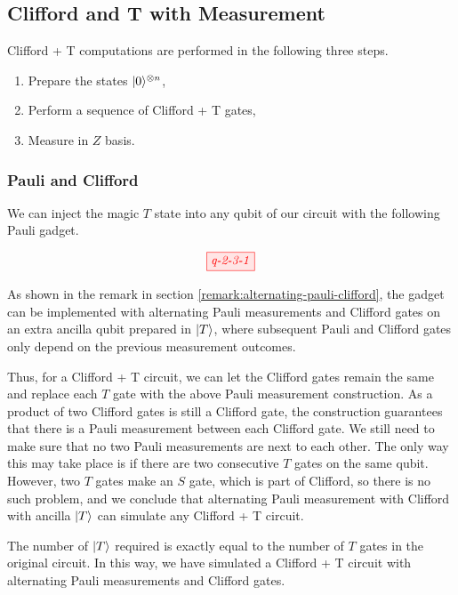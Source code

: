 \subsection{Clifford and T with Measurement}

Clifford + T computations are performed in the following three steps.
\begin{enumerate}
	\item Prepare the states $|0\rangle^{\otimes n}$,
	\item Perform a sequence of Clifford + T gates,
	\item Measure in $Z$ basis.
\end{enumerate}


\subsubsection{Pauli and Clifford}




We can inject the magic $T$ state into any qubit of our circuit with the following Pauli gadget.

\begin{align}\label{eq:embed-S}
	\tikzfig{q-2-3-1}
\end{align}

As shown in the remark in section \ref{remark:alternating-pauli-clifford}, the gadget can be implemented with alternating Pauli measurements and Clifford gates on an extra ancilla qubit prepared in $|T\rangle$, where subsequent Pauli and Clifford gates only depend on the previous measurement outcomes.

Thus, for a Clifford + T circuit, we can let the Clifford gates remain the same and replace each $T$ gate with the above Pauli measurement construction. 
As a product of two Clifford gates is still a Clifford gate, the construction guarantees that there is a Pauli measurement between each Clifford gate. 
We still need to make sure that no two Pauli measurements are next to each other. 
The only way this may take place is if there are two consecutive $T$ gates on the same qubit. 
However, two $T$ gates make an $S$ gate, which is part of Clifford, so there is no such problem, and we conclude that alternating Pauli measurement with Clifford with ancilla $|T\rangle$ can simulate any Clifford + T circuit.

The number of $|T\rangle$ required is exactly equal to the number of $T$ gates in the original circuit.
In this way, we have simulated a Clifford + T circuit with alternating Pauli measurements and Clifford gates.

